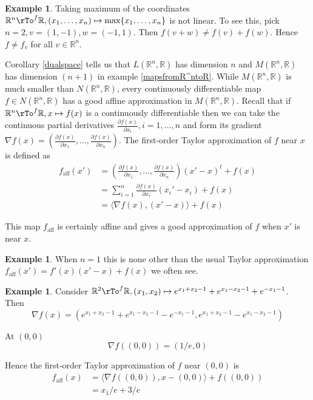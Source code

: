 \documentclass[12pt]{amsart}
\theoremstyle{definition}
\newtheorem{example}[theorem]{Example}
\begin{document}
\begin{example} Taking maximum of the coordinates $\mathbb{R}^n \rTo^f \mathbb{R}, (x_1, \dots, x_n) \mapsto \text{max}\{x_1, \dots, x_n\}$ is not linear. To see this, pick  $n = 2, v = (1,-1), w = (-1, 1)$. Then $f(v + w) \neq f(v) + f(w)$. Hence $f \neq f_v$ for all $v \in \mathbb{R}^n$.
\end{example} 

Corollary \ref{dualspace} tells us that $L(\mathbb{R}^n, \mathbb{R})$ has dimension $n$ and $M(\mathbb{R}^n, \mathbb{R})$ has dimension $(n+1)$ in example \ref{mapsfromR^ntoR}. While $M(\mathbb{R}^n, \mathbb{R})$ is much smaller than $N(\mathbb{R}^n, \mathbb{R})$, every continuously differentiable map $f \in N(\mathbb{R}^n, \mathbb{R})$ has a good affine approximation in $M(\mathbb{R}^n, \mathbb{R})$. Recall that if $\mathbb{R}^n \rTo^f \mathbb{R}, x \mapsto f(x)$ is a continuously differentiable then we can take the continuous partial derivatives $\frac{\partial f(x)}{\partial x_i}, i = 1, \dots, n$ and form its gradient $\nabla f(x) = (\frac{\partial f(x)}{\partial x_1}, \dots, \frac{\partial f(x)}{\partial x_n})$. The first-order Taylor approximation of $f$ near $x$ is defined as
\begin{align*}
f_{\text{aff}}(x') & = (\frac{\partial f(x)}{\partial x_1}, \dots, \frac{\partial f(x)}{\partial x_n})(x' -x)^t + f(x) \\
 & = \sum\limits_{i = 1}^{n} \frac{\partial f(x)}{\partial x_i}(x_i' - x_i) + f(x) \\
 & = \langle \nabla f(x), (x' - x)\rangle + f(x)
\end{align*}

This map $f_{\text{aff}}$ is certainly affine and gives a good approximation of $f$ when $x'$ is near $x$.

\begin{example} When $n = 1$ this is none other than the usual Taylor approximation $f_{\text{aff}}(x') = f'(x)(x' - x) + f(x)$ we often see.
\end{example}

\begin{example} Consider $\mathbb{R}^2 \rTo^f \mathbb{R}, (x_1, x_2) \mapsto e^{x_1 + x_2 -1} + e^{x_1 - x_2 -1} + e^{-x_1 -1}$. Then
$$\nabla f(x) = (e^{x_1 + x_2 -1} + e^{x_1 - x_2 -1} - e^{-x_1 -1}, e^{x_1 + x_2 -1} - e^{x_1 - x_2 -1})$$

At $(0,0)$
$$\nabla f((0,0)) = (1/e, 0)$$

Hence the first-order Taylor approximation of $f$ near $(0,0)$ is
\begin{align*}
f_{\text{aff}}(x) & = \langle \nabla f((0,0)) , x - (0,0) \rangle + f((0,0)) \\
 & = x_1/e + 3/e
\end{align*}
\end{example}
\end{document}

